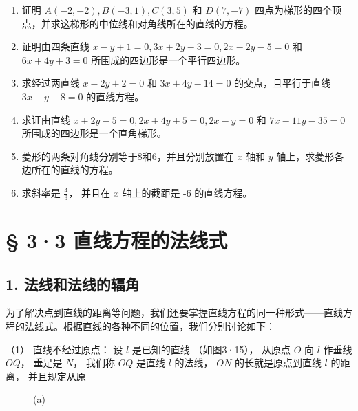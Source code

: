 \begin{enumerate}
\def\labelenumi{\arabic{enumi}.}
\setcounter{enumi}{5}
\item
  证明 \(A(-2, -2), B(-3, 1), C(3, 5)\) 和 \(D(7, -7)\)
  四点为梯形的四个顶点，并求这梯形的中位线和对角线所在的直线的方程。
\item
  证明由四条直线 \(x - y + 1 = 0, 3x + 2y - 3 = 0, 2x - 2y - 5 = 0\) 和
  \(6x + 4y + 3 = 0\) 所围成的四边形是一个平行四边形。
\item
  求经过两直线 \(x - 2y + 2 = 0\) 和 \(3x + 4y - 14 = 0\)
  的交点，且平行于直线 \(3x - y - 8 = 0\) 的直线方程。
\item
  求证由直线 \(x + 2y - 5 = 0, 2x + 4y + 5 = 0, 2x - y = 0\) 和
  \(7x - 11y - 35 = 0\) 所围成的四边形是一个直角梯形。
\item
  菱形的两条对角线分别等于8和6，并且分别放置在 \(x\) 轴和 \(y\)
  轴上，求菱形各边所在的直线的方程。
\item
  求斜率是 \(\frac{4}{3}\)， 并且在 \(x\) 轴上的截距是 -6 的直线方程。
\end{enumerate}

\section{§ 3·3
直线方程的法线式}\label{ux76f4ux7ebfux65b9ux7a0bux7684ux6cd5ux7ebfux5f0f}

\subsection{1.
法线和法线的辐角}\label{ux6cd5ux7ebfux548cux6cd5ux7ebfux7684ux8f90ux89d2}

为了解决点到直线的距离等问题，我们还要掌握直线方程的同一种形式------直线方程的法线式。根据直线的各种不同的位置，我们分别讨论如下：

（1） 直线不经过原点： 设 \(l\) 是已知的直线 （如图3·15）， 从原点 \(O\)
向 \(l\) 作垂线 \(OQ\)， 垂足是 \(N\)， 我们称 \(OQ\) 是直线 \(l\)
的法线， \(ON\) 的长就是原点到直线 \(l\) 的距离， 并且规定从原

\begin{figure}
\centering
{}
\caption{(a)}
\end{figure}

